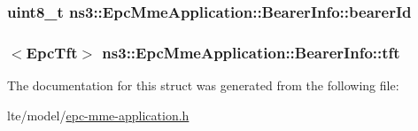 \subsubsection[{\texorpdfstring{bearer\+Id}{bearerId}}]{\setlength{\rightskip}{0pt plus 5cm}uint8\+\_\+t ns3\+::\+Epc\+Mme\+Application\+::\+Bearer\+Info\+::bearer\+Id}\hypertarget{structns3_1_1EpcMmeApplication_1_1BearerInfo_a189d6bdd0ff5cc3e2cc0910dcff1fad1}{}\label{structns3_1_1EpcMmeApplication_1_1BearerInfo_a189d6bdd0ff5cc3e2cc0910dcff1fad1}
\subsubsection[{\texorpdfstring{tft}{tft}}]{$<${\bf Epc\+Tft}$>$ ns3\+::\+Epc\+Mme\+Application\+::\+Bearer\+Info\+::tft}\hypertarget{structns3_1_1EpcMmeApplication_1_1BearerInfo_ab82e09b5b70eeccff337bb03e84b1ae9}{}\label{structns3_1_1EpcMmeApplication_1_1BearerInfo_ab82e09b5b70eeccff337bb03e84b1ae9}


The documentation for this struct was generated from the following file\+:\begin{DoxyCompactItemize}
\item 
lte/model/\hyperlink{epc-mme-application_8h}{epc-\/mme-\/application.\+h}\end{DoxyCompactItemize}
